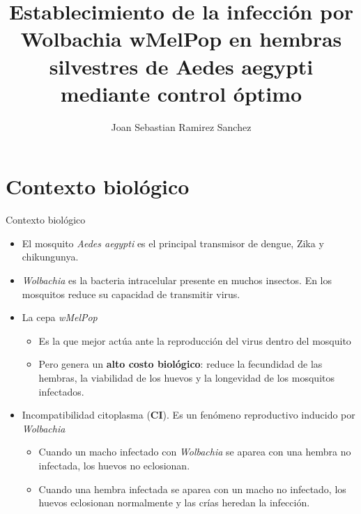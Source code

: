 \documentclass[10pt, aspectratio=169]{beamer}
\title{Establecimiento de la infección por Wolbachia wMelPop en hembras silvestres de Aedes aegypti mediante control óptimo}
\author{Joan Sebastian Ramirez Sanchez}
\institute{ Departamento de Matemáticas \\
   Universidad del Valle}
\newcommand{\tb}{\textbf}
\newcommand{\ti}{\textit}
\begin{document}
\begin{frame}
    \titlepage%
\end{frame}


\section{Contexto biológico}

\begin{frame}{Contexto biológico}
\begin{itemize}
    \item El mosquito \ti{Aedes aegypti} es el principal transmisor de dengue, Zika y chikungunya.
    \item \ti{Wolbachia} es la bacteria intracelular presente en muchos insectos. En los mosquitos reduce su capacidad de transmitir virus.
    \item La cepa \ti{wMelPop}
    \begin{itemize}
        \item[--] Es la que mejor actúa ante la reproducción del virus dentro del mosquito
        \item[--]Pero genera un \tb{alto costo biológico}: reduce la fecundidad de las hembras, la viabilidad de los huevos y la longevidad de los mosquitos infectados.
    \end{itemize}
    \item  Incompatibilidad citoplasma (\tb{CI}).
    Es un fenómeno reproductivo inducido por \ti{Wolbachia}
    \begin{itemize}
        \item[--] Cuando un macho infectado con \ti{Wolbachia} se aparea con una hembra no infectada, los huevos no eclosionan.
        \item[--] Cuando una hembra infectada se aparea con un macho no infectado, los huevos eclosionan normalmente y las crías heredan la infección.
    \end{itemize}
\end{itemize}

\end{frame}
\end{document}
